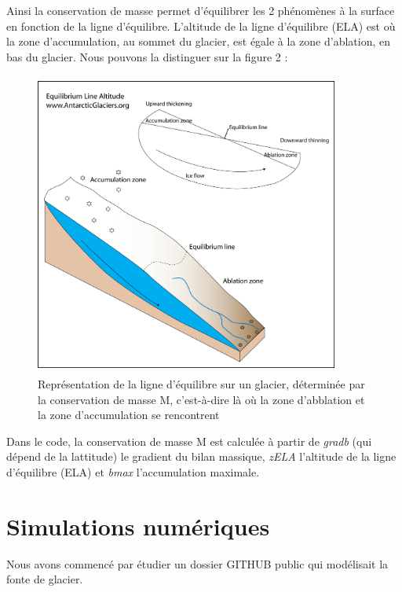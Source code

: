 \documentclass{article}
\begin{document}
\newpage
Ainsi la conservation de masse permet d'équilibrer les 2 phénomènes à la surface en fonction de la ligne d'équilibre. L'altitude de la ligne d'équilibre (ELA) est où la zone d'accumulation, au sommet du glacier, est égale à la zone d'ablation, en bas du glacier. Nous pouvons la distinguer sur la figure 2 : 
\begin{figure}[!htpb]
\centering
\includegraphics[width=10cm, keepaspectratio=true, height=10cm]{equilibrium_line_altitude1.png}
\caption{Représentation de la ligne d'équilibre sur un glacier, déterminée par la conservation de masse M, c'est-à-dire là où la zone d'abblation et la zone d'accumulation se rencontrent}

\end{figure}



Dans le code, la conservation de masse M est calculée à partir de \textit{gradb} (qui dépend de la lattitude) le gradient du bilan massique, \textit{zELA} l'altitude de la ligne d'équilibre (ELA) et \textit{bmax} l'accumulation maximale.
\newpage
\section{Simulations numériques}

Nous avons commencé par étudier un dossier GITHUB public \cite{site2} qui modélisait la fonte de glacier.
\newline
\end{document}
